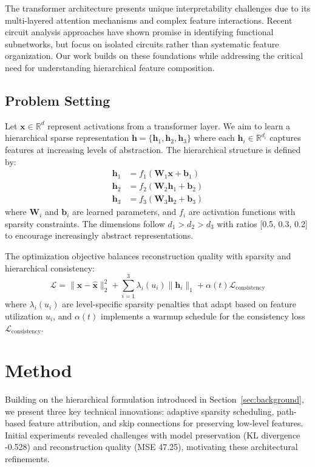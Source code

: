\documentclass{article} %
\begin{document}
The transformer architecture \cite{vaswani2017attention} presents unique interpretability challenges due to its multi-layered attention mechanisms and complex feature interactions. Recent circuit analysis approaches \cite{Conmy2023TowardsAC} have shown promise in identifying functional subnetworks, but focus on isolated circuits rather than systematic feature organization. Our work builds on these foundations while addressing the critical need for understanding hierarchical feature composition.

\subsection{Problem Setting}
Let $\mathbf{x} \in \mathbb{R}^d$ represent activations from a transformer layer. We aim to learn a hierarchical sparse representation $\mathbf{h} = \{\mathbf{h}_1, \mathbf{h}_2, \mathbf{h}_3\}$ where each $\mathbf{h}_i \in \mathbb{R}^{d_i}$ captures features at increasing levels of abstraction. The hierarchical structure is defined by:
\begin{align*}
    \mathbf{h}_1 &= f_1(\mathbf{W}_1\mathbf{x} + \mathbf{b}_1) \\
    \mathbf{h}_2 &= f_2(\mathbf{W}_2\mathbf{h}_1 + \mathbf{b}_2) \\
    \mathbf{h}_3 &= f_3(\mathbf{W}_3\mathbf{h}_2 + \mathbf{b}_3)
\end{align*}
where $\mathbf{W}_i$ and $\mathbf{b}_i$ are learned parameters, and $f_i$ are activation functions with sparsity constraints. The dimensions follow $d_1 > d_2 > d_3$ with ratios [0.5, 0.3, 0.2] to encourage increasingly abstract representations.

The optimization objective balances reconstruction quality with sparsity and hierarchical consistency:
\begin{equation*}
    \mathcal{L} = \|\mathbf{x} - \hat{\mathbf{x}}\|_2^2 + \sum_{i=1}^3 \lambda_i(u_i)\|\mathbf{h}_i\|_1 + \alpha(t)\mathcal{L}_\text{consistency}
\end{equation*}
where $\lambda_i(u_i)$ are level-specific sparsity penalties that adapt based on feature utilization $u_i$, and $\alpha(t)$ implements a warmup schedule for the consistency loss $\mathcal{L}_\text{consistency}$.

\section{Method}
\label{sec:method}

Building on the hierarchical formulation introduced in Section~\ref{sec:background}, we present three key technical innovations: adaptive sparsity scheduling, path-based feature attribution, and skip connections for preserving low-level features. Initial experiments revealed challenges with model preservation (KL divergence -0.528) and reconstruction quality (MSE 47.25), motivating these architectural refinements.
\end{document}
